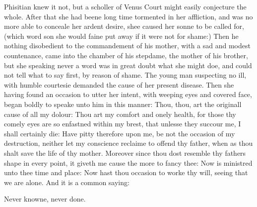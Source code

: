 Phisitian knew it not, but a scholler of Venus Court might easily conjecture
the whole. After that she had beene long time tormented in her affliction, and
was no more able to conceale her ardent desire, shee caused her sonne to be
called for, (which word son she would faine put away if it were not for shame:)
Then he nothing disobedient to the commandement of his mother, with a sad and
modest countenance, came into the chamber of his stepdame, the mother of his
brother, but she speaking never a word was in great doubt what she might doe,
and could not tell what to say first, by reason of shame. The young man
suspecting no ill, with humble courtesie demanded the cause of her present
disease. Then she having found an occasion to utter her intent, with weeping
eyes and covered face, began boldly to speake unto him in this manner: Thou,
thou, art the originall cause of all my dolour: Thou art my comfort and onely
health, for those thy comely eyes are so enfastned within my brest, that
unlesse they succour me, I shall certainly die: Have pitty therefore upon me,
be not the occasion of my destruction, neither let my conscience reclaime to
offend thy father, when as thou shalt save the life of thy mother. Moreover
since thou dost resemble thy fathers shape in every point, it giveth me cause
the more to fancy thee: Now is ministred unto thee time and place: Now hast
thou occasion to worke thy will, seeing that we are alone. And it is a common
saying:

Never knowne, never done.

